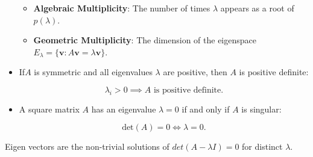\documentclass[
  letterpaper,
  DIV=11,
  numbers=noendperiod]{scrreprt}
\providecommand{\tightlist}{%
  \setlength{\itemsep}{0pt}\setlength{\parskip}{0pt}}\usepackage{longtable,booktabs,array}
\theoremstyle{plain}
\theoremstyle{definition}
\theoremstyle{remark}
\begin{document}
\begin{tcolorbox}
\begin{itemize}
  \begin{itemize}
  \tightlist
  \item
    \textbf{Algebraic Multiplicity}: The number of times \(\lambda\)
    appears as a root of \(p(\lambda)\).
  \item
    \textbf{Geometric Multiplicity}: The dimension of the eigenspace
    \(E_{\lambda} = \{\mathbf{v} : A\mathbf{v} = \lambda \mathbf{v}\}\).
  \end{itemize}
\item
  If\(A\) is symmetric and all eigenvalues \(\lambda\) are positive,
  then \(A\) is positive definite:

  \[
  \lambda_i > 0 \implies A \text{ is positive definite.}
  \]
\item
  A square matrix \(A\) has an eigenvalue \(\lambda = 0\) if and only if
  \(A\) is singular:

  \[
  \text{det}(A) = 0 \iff \lambda = 0.
  \]
\end{itemize}

\end{tcolorbox}

\begin{tcolorbox}[enhanced jigsaw, leftrule=.75mm, bottomtitle=1mm, colback=white, toptitle=1mm, opacitybacktitle=0.6, toprule=.15mm, colbacktitle=quarto-callout-important-color!10!white, arc=.35mm, colframe=quarto-callout-important-color-frame, title=\textcolor{quarto-callout-important-color}{\faExclamation}\hspace{0.5em}{Eigen Vectors}, titlerule=0mm, rightrule=.15mm, left=2mm, bottomrule=.15mm, breakable, coltitle=black, opacityback=0]

Eigen vectors are the non-trivial solutions of \(det(A-\lambda I)=0\)
for distinct \(\lambda\).

\end{tcolorbox}
\end{document}
